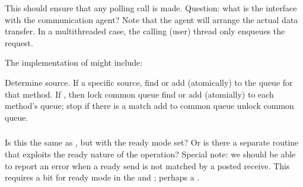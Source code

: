 \documentclass{article}
\begin{document}
\subsubsection{}
\begin{adi3}
\begin{mmadi}
\\
\\
\begin{core}
This should ensure that any polling call is made.  Question: what is
the interface with the communication agent?  Note that the agent will
arrange the actual data transfer.  In a multithreaded case, the
calling (user) thread only enqueues the request.

The implementation of  might include:
\begin{mmadi}
Determine source.  If a specific source, find or add (atomically) to
the queue for that method. 
If , then 
    lock common queue
    find or add (atomially) to each method's queue; stop if there is a
    match
    add to common queue
    unlock common queue.
\end{mmadi}

\end{core}
\end{mmadi}
\end{adi3}

\subsubsection{}
Is this the same as , but with the ready mode set?  Or is
there a separate routine that exploits the ready nature of the operation?
Special note: we should be able to report an error when a ready send is not
matched by a posted receive.  This requires a bit for ready mode in the
 and ; perhaps a
. 
\end{document}
